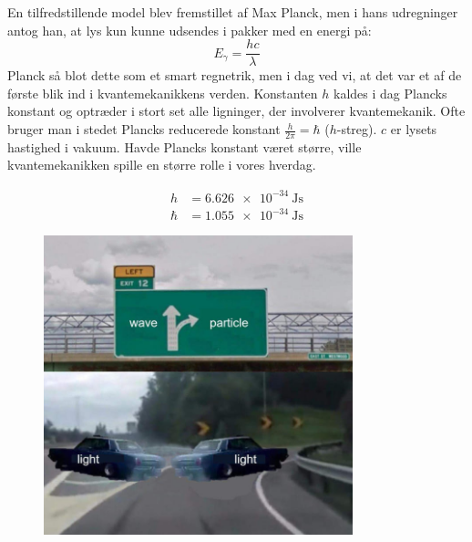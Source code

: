 \documentclass[../Kvantemekanik.tex]{subfiles}
\begin{document}
En tilfredstillende model blev fremstillet af Max Planck, men i hans udregninger antog han, at lys kun kunne udsendes i pakker med en energi på:
\begin{equation}\label{kvant:fotonEnergi}
E_\gamma = \frac{hc}{\lambda}
\end{equation}
Planck så blot dette som et smart regnetrik, men i dag ved vi, at det var et af de første blik ind i kvantemekanikkens verden. Konstanten $h$ kaldes i dag Plancks konstant og optræder i stort set alle ligninger, der involverer kvantemekanik. Ofte bruger man i stedet Plancks reducerede konstant $\frac{h}{2\pi}=\hbar$ ($h$-streg). $c$ er lysets hastighed i vakuum.
Havde Plancks konstant været større, ville kvantemekanikken spille en større rolle i vores hverdag.

\begin{align*}
h &= \SI{6.626e-34}{\joule\second}\\
\hbar &= \SI{1.055e-34}{\joule\second}
\end{align*}

\begin{figure}[h!]
    \centering
    \includegraphics[width = 0.8\textwidth]{Kvantemekanik/billeder/dualitet.jpg}
\end{figure}
\end{document}
